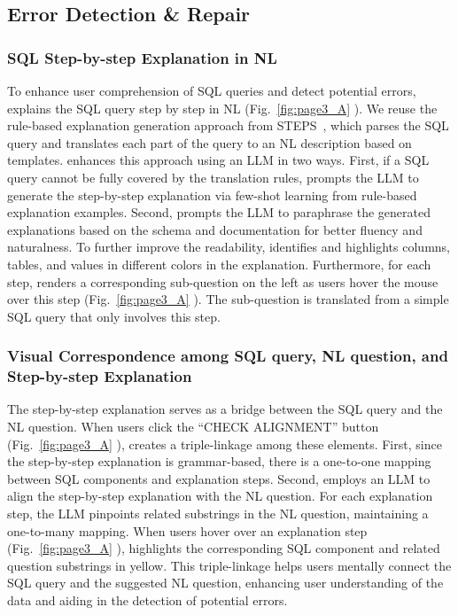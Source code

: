 \subsection{Error Detection \& Repair}

\subsubsection{SQL Step-by-step Explanation in NL}
To enhance user comprehension of SQL queries and detect potential errors, {\tool} explains the SQL query step by step in NL (Fig.~\ref{fig:page3_A} ).
We reuse the rule-based explanation generation approach from STEPS~\cite{STEPS}, which parses the SQL query and translates each part of the query to an NL description based on templates.
{\tool} enhances this approach using an LLM in two ways. 
First, if a SQL query cannot be fully covered by the translation rules, {\tool} prompts the LLM to generate the step-by-step explanation via few-shot learning from rule-based explanation examples. 
Second, {\tool} prompts the LLM to paraphrase the generated explanations based on the schema and documentation for better fluency and naturalness.  To further improve the readability, {\tool} identifies and highlights columns, tables, and values in different colors in the explanation. 
Furthermore, for each step, {\tool} renders a corresponding sub-question on the left as users hover the mouse over this step (Fig.~\ref{fig:page3_A} ). 
The sub-question is translated from a simple SQL query that only involves this step.

\subsubsection{Visual Correspondence among SQL query, NL question, and Step-by-step Explanation}
The step-by-step explanation serves as a bridge between the SQL query and the NL question. When users click the ``CHECK ALIGNMENT'' button (Fig.~\ref{fig:page3_A} ), {\tool} creates a triple-linkage among these elements.
First, since the step-by-step explanation is grammar-based, there is a one-to-one mapping between SQL components and explanation steps.
Second, {\tool} employs an LLM to align the step-by-step explanation with the NL question. For each explanation step, the LLM pinpoints related substrings in the NL question, maintaining a one-to-many mapping.
When users hover over an explanation step (Fig.~\ref{fig:page3_A} ), {\tool} highlights the corresponding SQL component and related question substrings in yellow.
This triple-linkage helps users mentally connect the SQL query and the suggested NL question, enhancing user understanding of the data and aiding in the detection of potential errors.

